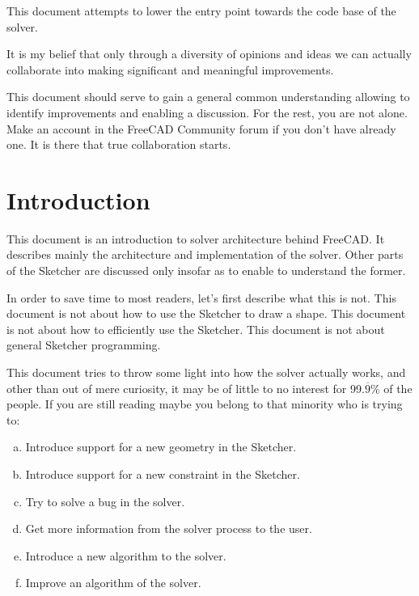 \documentclass[12pt,twoside,a4paper]{book}
\newcommand{\textoverline}[1]{$\overline{\mbox{#1}}$}
\begin{document}
    This document attempts to lower the entry point towards the code base of the solver.

    It is my belief that only through a diversity of opinions and ideas we can actually collaborate into making significant and meaningful improvements.

    This document should serve to gain a general common understanding allowing to identify improvements and enabling a discussion. For the rest, you are not alone. Make an account in the FreeCAD Community forum if you don't have already one. It is there that true collaboration starts.



    \tableofcontents
    \newpage

    \mainmatter

    \chapter{Introduction}

    This document is an introduction to solver architecture behind FreeCAD. It describes mainly the architecture and implementation of the solver. Other parts of the Sketcher are discussed only insofar as to enable to understand the former.

    In order to save time to most readers, let's first describe what this is not. This document is not about how to use the Sketcher to draw a shape. This document is not about how to efficiently use the Sketcher. This document is not about general Sketcher programming.

    This document tries to throw some light into how the solver actually works, and other than out of mere curiosity, it may be of little to no interest for 99.\textoverline{9}\% of the people. If you are still reading maybe you belong to that minority who is trying to:

    \begin{enumerate}[a)]
    \item Introduce support for a new geometry in the Sketcher.
    \item Introduce support for a new constraint in the Sketcher.
    \item Try to solve a bug in the solver.
    \item Get more information from the solver process to the user.
    \item Introduce a new algorithm to the solver.
    \item Improve an algorithm of the solver.
    \end{enumerate}
\end{document}
